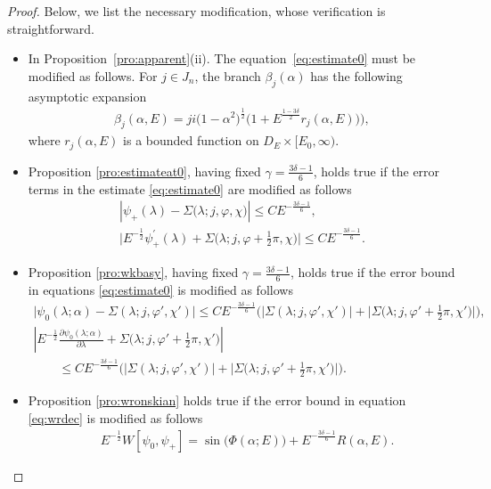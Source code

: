 \documentclass[pdftex]{sigma}
\numberwithin{equation}{section}
\newcommand{\la}{\lambda}
\newcommand{\al}{\alpha}
\begin{document}
\begin{proof}
Below, we list the necessary modif\/ication, whose verif\/ication is straightforward.
		\begin{itemize}\itemsep=0pt
			\item[(i)] In Proposition~\ref{pro:apparent}(ii). The equation~\eqref{eq:estimate0} must be modif\/ied as follows.
			For $j \in J_n$, the branch $\beta_j(\al)$ has the following asymptotic expansion
			\begin{gather*}
			\beta_j(\al,E)=j i \big(1-\al^2\big)^{\frac12} \big(1+E^{\frac{1-3 \delta}{2}}r_j(\al,E))\big) ,
			\end{gather*}
			where $r_j(\al,E)$ is a bounded function on $D_E \times [E_0,\infty)$.
			\item[(ii)]Proposition \ref{pro:estimateat0}, having f\/ixed $\gamma=\frac{3 \delta-1}6$,
			holds true if the error terms in the estimate
			\eqref{eq:estimate0}
			are modif\/ied as follows
			\begin{gather*}\nonumber
			 |\psi_+(\la)-\Sigma(\la;j,\varphi,\chi \big)| \leq C E^{-\frac{3\delta-1}{6}} , \\
			\big| E^{-\frac12} \psi_+^{\prime}(\la)+
			\Sigma\big(\la;j,\varphi+\tfrac{1}{2}\pi,\chi\big)\big| \leq C E^{-\frac{3\delta-1}{6}} .
			\end{gather*}
			\item[(iii)]Proposition \ref{pro:wkbasy}, having f\/ixed $\gamma=\frac{3 \delta-1}6$,
			holds true if the error bound in equations \eqref{eq:estimate0}
			is modif\/ied as follows
			\begin{gather*}
			 \big|\psi_0(\la;\al)-\Sigma(\la;j,\varphi',\chi') \big|\leq C E^{-\frac{3\delta-1}{6}} \big(|\Sigma(\la;j,\varphi',\chi')|+
			\big|\Sigma\big(\la;j,\varphi'+\tfrac{1}{2}\pi,\chi'\big)\big|\big), \\
			 \left|E^{-\frac12} \frac{\partial \psi_0(\la; \al)}{\partial \la}+\Sigma\big(\la;j,\varphi'+\tfrac{1}{2}\pi,\chi'\big)\right|\\
\qquad{} \leq C E^{-\frac{3\delta-1}{6}} \big(|\Sigma(\la;j,\varphi',\chi')|+\big|\Sigma\big(\la;j,\varphi'+\tfrac{1}{2}\pi,\chi'\big)\big|\big) .
			\end{gather*}
			\item[(iv)]Proposition \ref{pro:wronskian} holds true if the error bound in equation \eqref{eq:wrdec}
			is modif\/ied as follows
			\begin{align*}
			& E^{-\frac12}W[\psi_0,\psi_+]=\sin\big(\Phi(\al;E)\big)
			+ E^{-\frac{3\delta-1}{6}} R(\al,E) .
			\end{align*}

\end{itemize}
\end{proof}
\end{document}
